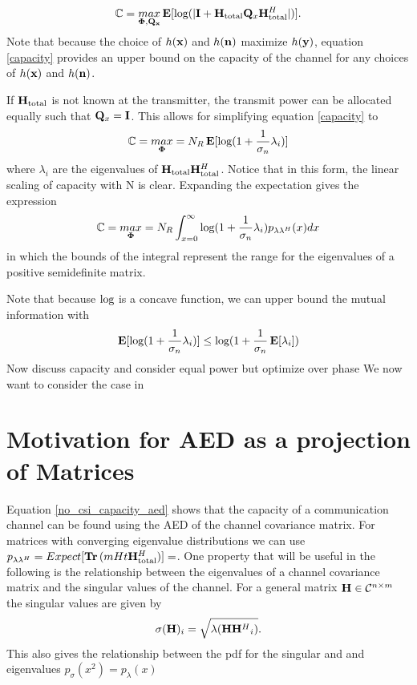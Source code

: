 \documentclass[12pt,a4paper]{report}
\begin{document}
\begin{equation}\label{capacity}
\mathbb{C} = \underset{\boldsymbol{\Phi},\mathbf{Q_x}}{\mathop{max}} \mathop{\bf E{}} [\text{log{}}(|\mathbf{I} + \mathbf{H}_\text{total} \mathbf{Q}_x \mathbf{H}_\text{total}^H|)].
\end{equation}
Note that because the choice of $h(\mathbf{x}) $ and $h(\mathbf{n})$ maximize $h(\mathbf{y})$, equation \eqref{capacity} provides an upper bound on the capacity of the channel for any choices of $h(\mathbf{x}) $ and $h(\mathbf{n})$.

If $\mathbf{H}_\text{total}$ is not known at the transmitter, the transmit power can be allocated
equally such that $\mathbf{Q}_x = \mathbf{I}$. This allows for simplifying equation \eqref{capacity} to 
\begin{equation}\label{no_csi_capacity}
\mathbb{C} = \underset{\boldsymbol{\Phi}}{\mathop{max}} = N_R \mathop{\bf E{}}[\text{log{}}(1 + \frac{1}{\sigma_n}\lambda_i)]
\end{equation}
where $\lambda_i$ are the eigenvalues of $\mathbf{H}_\text{total} \mathbf{H}_\text{total}^H$.
Notice that in this form, the linear scaling of capacity with N is clear.
Expanding the expectation gives the expression
\begin{equation}\label{no_csi_capacity_aed}
\mathbb{C} = \underset{\boldsymbol{\Phi}}{\mathop{max}} = N_R  \int_{x=0}^{\infty}\text{log{}}(1 + \frac{1}{\sigma_n}\lambda_i)p_{\lambda\lambda^H}(x) dx
\end{equation}
in which the bounds of the integral represent the range for the eigenvalues of a positive semidefinite matrix. 

Note that because $\text{log{}}$ is a concave function, we can upper bound the mutual information with
\begin{equation}\label{mut_inf}
\mathop{\bf E{}}[\text{log{}}(1 + \frac{1}{\sigma_n}\lambda_i)] \leq \text{log{}}(1 + \frac{1}{\sigma_n}\mathop{\bf E{}}[\lambda_i])
\end{equation}
Now discuss capacity and consider equal power but optimize over phase
We now want to consider the case in 

\section{Motivation for AED as a projection of Matrices}
Equation \ref{no_csi_capacity_aed} shows that the capacity of a communication channel can be found using the AED of the channel covariance matrix.
For matrices with converging eigenvalue distributions we can use $p_{\lambda\lambda^H} = Expect[\mathop{\bf Tr}{(mHt \mathbf{H}_\text{total}^H})] = $.
One property that will be useful in the following is the relationship between the eigenvalues of a channel covariance matrix and the singular values of
the channel.
For a general matrix $\mathbf{H} \in \mathcal{C}^{n \times m}$ the singular values are given by 
\begin{equation}\label{sigular_eigen}
\sigma(\mathbf{H})_i = \sqrt{\lambda({\mathbf{H}\mathbf{H}^H}_i)}.
\end{equation}
This also gives the relationship between the pdf for the singular and and eigenvalues $p_{\sigma}(x^2) = p_{\lambda}(x)$
\end{document}
